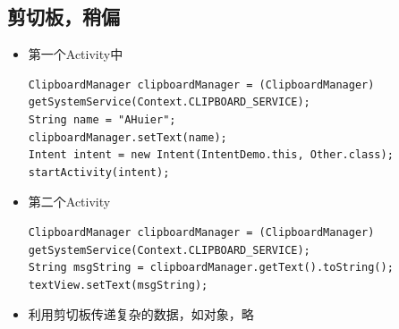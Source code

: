 \documentclass[9pt, b5paaper]{book}
\begin{document}
\subsection{剪切板，稍偏}
\label{sec-1-6-7}
\begin{itemize}
\item 第一个Activity中
\begin{verbatim}
ClipboardManager clipboardManager = (ClipboardManager) getSystemService(Context.CLIPBOARD_SERVICE);
String name = "AHuier";
clipboardManager.setText(name);
Intent intent = new Intent(IntentDemo.this, Other.class);
startActivity(intent);
\end{verbatim}
\item 第二个Activity
\begin{verbatim}
ClipboardManager clipboardManager = (ClipboardManager) getSystemService(Context.CLIPBOARD_SERVICE);
String msgString = clipboardManager.getText().toString();
textView.setText(msgString);
\end{verbatim}
\item 利用剪切板传递复杂的数据，如对象，略
\end{itemize}
\end{document}
